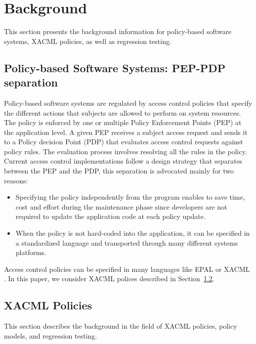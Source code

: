 
  
\section{Background}
\label{sec:background}
This section presents the background information for policy-based software systems, XACML policies, as well as regression testing.

\subsection{Policy-based Software Systems: PEP-PDP separation}
Policy-based software systems are regulated by access control policies that specify the different actions that subjects are allowed to perform on system resources. 
The policy is enforced by one or multiple Policy Enforcement Points (PEP) at the application level. A given PEP receives a subject access request and 
sends it to a Policy decision Point (PDP) that evaluates access control requests against policy rules. The evaluation process involves resolving all the rules in the policy. 
Current access control implementations follow a design strategy that separates between the PEP and the PDP, this separation is advocated mainly for two reasons:
\begin{itemize}
\item Specifying the policy independently from the program enables to save time, cost and effort during the maintenance phase since developers are not required 
to update the application code at each policy update.
\item When the policy is not hard-coded into the application, it can be specified in a standardized language and transported through many different systems platforms.
\end{itemize}
Access control policies can be specified in many languages like EPAL \cite{epal} or XACML \cite {oasis05:xacml}. 
In this paper, we consider XACML polices described in Section~\ref{sec:xacmlpolicies}.


\subsection{XACML Policies} \label{sec:xacmlpolicies}
This section describes the background in the field of XACML policies, policy models, and regression testing.

